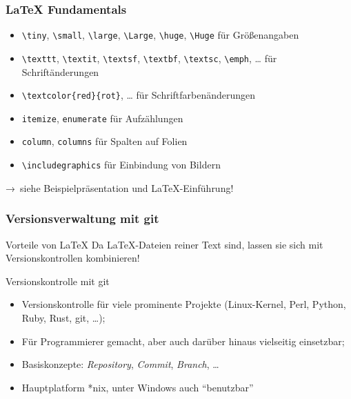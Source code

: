 \documentclass{cms-kurs}
\begin{document}
\begin{frame}[fragile]
  \frametitle{\LaTeX{} Fundamentals}

  \onslide<+->

  \begin{itemize}
  \item \lstinline{\tiny}, \lstinline{\small}, \lstinline{\large},
    \lstinline{\Large}, \lstinline{\huge}, \lstinline{\Huge} für Größenangaben
  \item \lstinline{\texttt}, \lstinline{\textit}, \lstinline{\textsf},
    \lstinline{\textbf}, \lstinline{\textsc}, \lstinline{\emph}, … für
    Schriftänderungen
  \item \lstinline=\textcolor{red}{rot}=, … für Schriftfarbenänderungen
  \item \lstinline{itemize}, \lstinline{enumerate} für Aufzählungen
  \item \lstinline{column}, \lstinline{columns} für Spalten auf Folien
  \item \lstinline{\includegraphics} für Einbindung von Bildern
  \end{itemize}

  \onslide<+->

  \medskip{}

  → siehe Beispielpräsentation und \LaTeX-Einführung!

\end{frame}

\begin{frame}
  \frametitle{Versionsverwaltung mit git}

  \onslide<+->

  \begin{block}{Vorteile von \LaTeX{}}
    Da \LaTeX{}-Dateien reiner Text sind, lassen sie sich mit Versionskontrollen
    kombinieren!
  \end{block}

  \onslide<+->

  \begin{block}{Versionskontrolle mit git}
    \begin{itemize}
    \item Versionskontrolle für viele prominente Projekte (Linux-Kernel, Perl,
      Python, Ruby, Rust, git, \ldots);
    \item Für Programmierer gemacht, aber auch darüber hinaus vielseitig
      einsetzbar;
    \item Basiskonzepte: \emph{Repository}, \emph{Commit}, \emph{Branch}, \ldots
    \item Hauptplatform *nix, unter Windows auch \enquote{benutzbar}
    \end{itemize}
  \end{block}

\end{frame}
\end{document}
